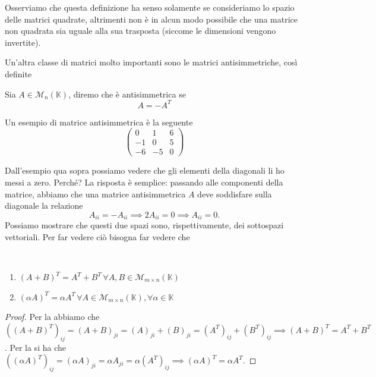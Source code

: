 \begin{remark}
  Osserviamo che questa definizione ha senso solamente se consideriamo lo spazio delle matrici quadrate, altrimenti non è in alcun modo possibile che una matrice non quadrata sia uguale alla sua trasposta (siccome le dimensioni vengono invertite).
\end{remark}
Un'altra classe di matrici molto importanti sono le matrici antisimmetriche, così definite
\begin{definition}
  Sia $A \in \mathcal{M}_n(\mathbb{K})$, diremo che è antisimmetrica se
  $$
  A = -A^T
  $$
\end{definition}
\begin{remark}
  Un esempio di matrice antisimmetrica è la seguente
  $$
    \begin{pmatrix}
      0 & 1 & 6 \\
      -1 & 0 & 5 \\
      -6 & -5 & 0 
    \end{pmatrix}
  $$
\end{remark}
Dall'esempio qua sopra possiamo vedere che gli elementi della diagonali li ho messi a zero. Perché? La risposta è semplice: passando alle componenti della matrice, abbiamo che una matrice antisimmetrica $A$ deve soddisfare sulla diagonale la relazione
$$
  A_{ii} = -A_{ii} \implies 2A_{ii} = 0 \implies A_{ii} = 0.
$$
Possiamo mostrare che questi due spazi sono, rispettivamente, dei sottospazi vettoriali. Per far vedere ciò bisogna far vedere che
\begin{lemma} \hspace{1cm} \\
  \begin{enumerate}[label=\protect\circled{\arabic*}]
    \item $(A+B)^T = A^T + B^T \, \forall A, B \in \mathcal{M}_{m \times n}(\mathbb{K})$ \\
    \item $(\alpha A)^T = \alpha A^T \, \forall A \in \mathcal{M}_{m \times n}(\mathbb{K}), \forall \alpha \in \mathbb{K}$
  \end{enumerate}
\end{lemma}
\begin{proof}
  Per la  abbiamo che $((A+B)^T)_{ij} = (A + B)_{ji} = (A)_{ji} + (B)_{ji} = (A^T)_{ij} + (B^T)_{ij} \implies (A + B)^T = A^T + B^T$. Per la  si ha che $((\alpha A)^T)_{ij} = (\alpha A)_{ji} = \alpha A_{ji} = \alpha (A^T)_{ij} \implies (\alpha A)^T = \alpha A^T$.
\end{proof}
